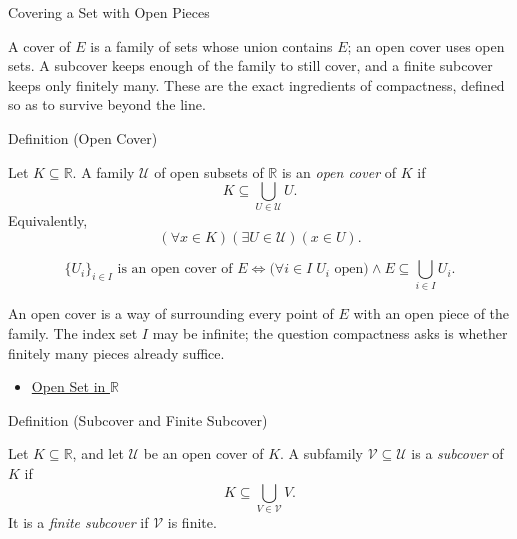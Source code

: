 \label{sec:covers-and-subcovers}

\begin{topicbox}{Covering a Set with Open Pieces}
\begin{exposition}
A cover of $E$ is a family of sets whose union contains $E$; an open cover uses open sets. A subcover keeps enough of the family to still cover, and a finite subcover keeps only finitely many. These are the exact ingredients of compactness, defined so as to survive beyond the line.
\end{exposition}
\end{topicbox}
\begin{definitionbox}{Definition (Open Cover)}
\begin{definition}
\label{def:real-open-cover}
Let $K\subseteq\mathbb{R}$.  A family $\mathcal{U}$ of open subsets of
$\mathbb{R}$ is an \emph{open cover} of $K$ if
\[
  K\subseteq\bigcup_{U\in\mathcal{U}}U.
\]
Equivalently,
\[
  (\forall x\in K)(\exists U\in\mathcal{U})(x\in U).
\]
\end{definition}
\end{definitionbox}
\begin{remark*}
\[
\{U_i\}_{i\in I} \text{ is an open cover of } E \Longleftrightarrow \bigl(\forall i\in I\;U_i \text{ open}\bigr)\land E\subseteq\textstyle\bigcup_{i\in I}U_i.
\]
\end{remark*}
\begin{remark*}[Interpretation]
An open cover is a way of surrounding every point of $E$ with an open piece of the family. The index set $I$ may be infinite; the question compactness asks is whether finitely many pieces already suffice.
\end{remark*}
\begin{dependencies}
\begin{itemize}
  \item \hyperref[def:open-set]{Open Set in $\mathbb{R}$}
\end{itemize}
\end{dependencies}
\begin{definitionbox}{Definition (Subcover and Finite Subcover)}
\begin{definition}
\label{def:finite-subcover}
Let $K\subseteq\mathbb{R}$, and let $\mathcal{U}$ be an open cover of $K$.
A subfamily $\mathcal{V}\subseteq\mathcal{U}$ is a \emph{subcover} of $K$ if
\[
  K\subseteq\bigcup_{V\in\mathcal{V}}V.
\]
It is a \emph{finite subcover} if $\mathcal{V}$ is finite.
\end{definition}
\end{definitionbox}
